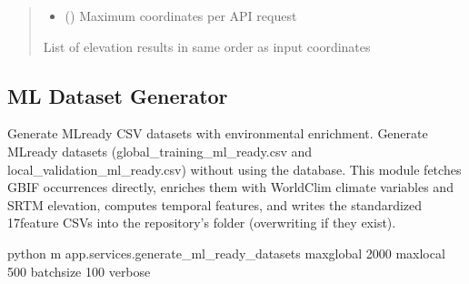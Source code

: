 \documentclass[letterpaper,10pt,english]{sphinxmanual}
\begin{document}
\begin{fulllineitems}
\begin{fulllineitems}
\begin{quote}
\begin{description}
\begin{itemize}
\item {} 
\sphinxAtStartPar
{} () \textendash{} Maximum coordinates per API request

\end{itemize}

\sphinxAtStartPar
{}

\sphinxAtStartPar
List of elevation results in same order as input coordinates

\end{description}\end{quote}

\end{fulllineitems}


\end{fulllineitems}



\subsection{ML Dataset Generator}
\label{\detokenize{api_reference:ml-dataset-generator}}
\sphinxAtStartPar
Generate ML\sphinxhyphen{}ready CSV datasets with environmental enrichment.
\label{\detokenize{api_reference:module-app.services.generate_ml_ready_datasets}}
\sphinxAtStartPar
Generate ML\sphinxhyphen{}ready datasets (global\_training\_ml\_ready.csv and local\_validation\_ml\_ready.csv)
without using the database. This module fetches GBIF occurrences directly, enriches them
with WorldClim climate variables and SRTM elevation, computes temporal features, and writes
the standardized 17\sphinxhyphen{}feature CSVs into the repository’s  folder (overwriting if they exist).
\begin{description}
\sphinxAtStartPar
python \sphinxhyphen{}m app.services.generate\_ml\_ready\_datasets     \textendash{}max\sphinxhyphen{}global 2000 \textendash{}max\sphinxhyphen{}local 500 \textendash{}batch\sphinxhyphen{}size 100 \textendash{}verbose

\end{description}
\end{document}
